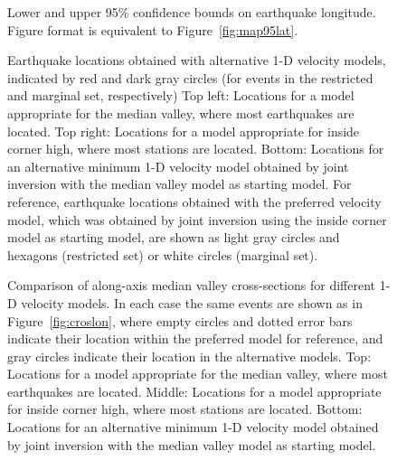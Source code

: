 \documentclass[aguplus]{aguplus}
\renewcommand{\includefig}[2]{}
\newlength{\tw}
\begin{document}
\begin{figure}

\includefig{seismag-map-95/seismag-map-95-2}{0.65\tw} %

\includefig{seismag-map-95/seismag-map-95-3}{0.65\tw} %

\caption{Lower and upper 95\% confidence bounds on earthquake
longitude.  Figure format is equivalent to Figure~\ref{fig:map95lat}. }
\label{fig:map95lon}
\end{figure}

\begin{figure}

\setlength{\figarrwidth}{0.5\tw}

\includefig{seismag-map-var/seismag-map-jhd-mva-obh10}{20pc} \includefig{seismag-map-var/seismag-map-jhd-pro109kmvel}{20pc} %

\includefig{seismag-map-var/seismag-map-inv-mva-obh10}{20pc} %

\caption{Earthquake locations obtained with alternative 1-D velocity
models, indicated by  red and dark gray circles (for events in the
restricted and marginal set, respectively)
Top left: Locations for a model appropriate for the median valley, where most
earthquakes are located.
Top right: Locations for a model appropriate for inside corner high, where most
stations are located.
Bottom: Locations for an alternative minimum 1-D velocity model
obtained by joint inversion with the median valley model as starting
model.
  For reference, earthquake locations obtained with the
preferred velocity model, which was obtained by joint inversion using
the inside corner model as starting model, are shown as
 light gray circles and hexagons  (restricted set) or white circles
(marginal set). }
\label{fig:mapvar}
\end{figure}


\begin{figure}

\includefig{cros/cros-ns-jhd-mva-obh10}{30pc} %

\includefig{cros/cros-ns-jhd-pro109kmvel}{30pc} %

\includefig{cros/cros-ns-inv-mva-obh10}{30pc} %

\caption{Comparison of along-axis median valley cross-sections for different 1-D velocity
models.  In each case the same events are shown as in
Figure~\ref{fig:croslon}, where empty circles and dotted error bars
indicate their location within the preferred model for reference, and
gray circles indicate their location in the alternative models.
Top: Locations for a model appropriate for the median valley, where most
earthquakes are located.
Middle: Locations for a model appropriate for inside corner high, where most
stations are located.
Bottom: Locations for an alternative minimum 1-D velocity model
obtained by joint inversion with the median valley model as starting
model.}
\label{fig:croslonvar}
\end{figure}
\end{document}
